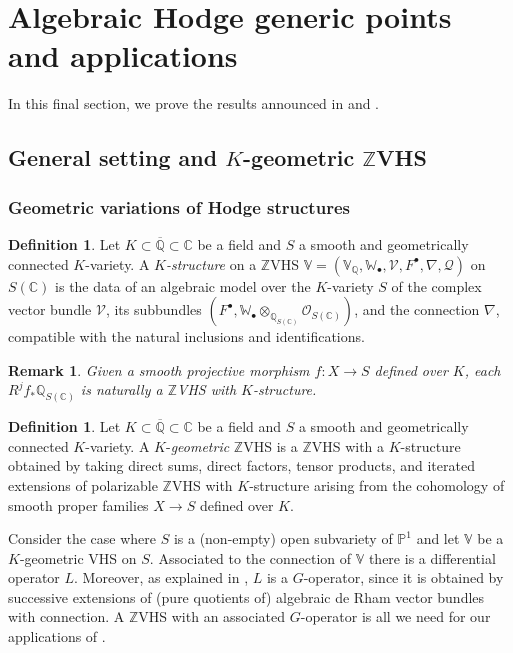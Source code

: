 \documentclass[10pt]{article}
\numberwithin{equation}{section}
\theoremstyle{plain}
\newtheorem{rem}[thm]{Remark}
\theoremstyle{definition}
\newtheorem{defn}[thm]{Definition}
\theoremstyle{remark}
\newcommand{\C}{\mathbb{C}}
\newcommand{\Qbar}{\overline{\mathbb{Q}}}
\newcommand{\Q}{\mathbb{Q}}
\newcommand{\Z}{\mathbb{Z}}
\newcommand{\V}{\mathbb{V}}
\begin{document}
\section{Algebraic Hodge generic points and applications}\label{sec6}

In this final section, we prove the results announced in  and .

\subsection{General setting and $K$-geometric $\Z$VHS} \label{setting}


\subsubsection{Geometric variations of Hodge structures}

\begin{defn}
 Let $K\subset \Qbar \subset \C$ be a field and $S$ a smooth and geometrically connected $K$-variety. A \emph{$K$-structure} on a $\Z$VHS $\V = (\V_\Q, \mathbb{W}_{\bullet}, \mathcal{V}, F^\bullet, \nabla, \mathcal{Q})$ on $S(\C)$ is the data of an algebraic model over the $K$-variety $S$ of the complex vector bundle $\mathcal{V}$, its subbundles $(F^\bullet, \mathbb{W}_{\bullet}\otimes_{\Q_{S(\C)}} \mathcal{O}_{S(\C)})$, and the connection $\nabla$, compatible with the natural inclusions and identifications.
\end{defn}

\begin{rem}
    Given a smooth projective morphism $f: X \to S$ defined over $K$, each $R^jf_*\Q_{S(\C)}$ is naturally a $\Z$VHS with $K$-structure.
\end{rem}


\begin{defn}\label{everythinggeneralizesrem} 
Let $K \subset \Qbar \subset \C$ be a field and $S$ a smooth and geometrically connected $K$-variety. A $K$-\emph{geometric} $\Z$VHS is a $\Z$VHS with a $K$-structure obtained by taking direct sums, direct factors, tensor products, and iterated extensions of polarizable $\mathbb{Z}$VHS with $K$-structure arising from the cohomology of smooth proper families $X\to S$ defined over $K$. 
\end{defn} 

Consider the case where $S$ is a (non-empty) open subvariety of $\mathbb{P}^{1}$ and let $\V$ be a $K$-geometric VHS on $S$.  Associated to the connection of $\V$ there is a differential operator $L$. Moreover, as explained in , $L$ is a $G$-operator, since it is obtained by successive extensions of (pure quotients of) algebraic de Rham vector bundles with connection. A $\Z$VHS with an associated $G$-operator is all we need for our applications of . 
\end{document}
